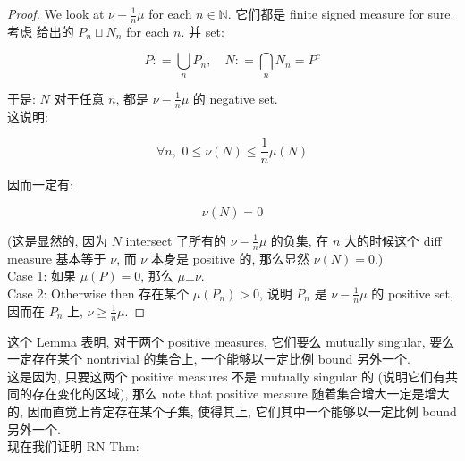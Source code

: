 \begin{proof}

We look at \(\nu - \frac{1}{n}\mu\) for each \(n \in \mathbb{N}\). 它们都是 finite signed measure for sure.\\
考虑  给出的 \(P_{n} \sqcup N_{n}\) for each \(n\). 并 set:

\[P: = \bigcup\limits_{n}P_{n},\quad N: = \bigcap\limits_{n}N_{n} = P^{c}\]

于是: \(N\) 对于任意 \(n\), 都是 \(\nu - \frac{1}{n}\mu\) 的 negative set.\\
这说明:

\[\forall n,\,\, 0 \leq \nu(N) \leq \frac{1}{n}\mu(N)\]

因而一定有:

\[\nu(N) = 0\]

(这是显然的, 因为 \(N\) intersect 了所有的 \(\nu - \frac{1}{n}\mu\) 的负集, 在 \(n\) 大的时候这个 diff measure 基本等于 \(\nu\), 而 \(\nu\) 本身是 positive 的, 那么显然 \(\nu(N) = 0\).)\\
Case 1: 如果 \(\mu(P) = 0\), 那么 \(\mu\bot\nu\).\\
Case 2: Otherwise then 存在某个 \(\mu(P_{n}) > 0\), 说明 \(P_{n}\) 是 \(\nu - \frac{1}{n}\mu\) 的 positive set, 因而在 \(P_{n}\) 上, \(\nu \geq \frac{1}{n}\mu\).

\end{proof}

这个 Lemma 表明, 对于两个 positive measures, 它们要么 mutually singular, 要么一定存在某个 nontrivial 的集合上, 一个能够以一定比例 bound 另外一个.\\
这是因为, 只要这两个 positive measures 不是 mutually singular 的 (说明它们有共同的存在变化的区域), 那么 note that positive measure 随着集合增大一定是增大的, 因而直觉上肯定存在某个子集, 使得其上, 它们其中一个能够以一定比例 bound 另外一个.\\
现在我们证明 RN Thm:


